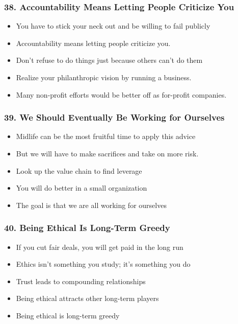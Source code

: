 \begin{frame}[fragile]
\frametitle{38. Accountability Means Letting People Criticize You}
\begin{itemize}
\item You have to stick your neck out and be willing to fail publicly
\item Accountability means letting people criticize you.
\item Don't refuse to do things just because others can't do them
\item Realize your philanthropic vision by running a business.
\item Many non-profit efforts would be better off  as for-profit companies.
\end{itemize}
\end{frame}

\begin{frame}[fragile]
\frametitle{39. We Should Eventually Be Working for Ourselves}
\begin{itemize}
\item Midlife can be the most fruitful time to apply this advice
\item But we will have to make sacrifices and take on more risk.
\item Look up the value chain to find leverage
\item You will do better in a small organization
\item The goal is that we are all working for ourselves
\end{itemize}
\end{frame}

\begin{frame}[fragile]
\frametitle{40. Being Ethical Is Long-Term Greedy}
\begin{itemize}
\item If you cut fair deals, you will get paid in the long run
\item Ethics isn't something you study; it's something you do
\item Trust leads to compounding relationships
\item Being ethical attracts other long-term players
\item Being ethical is long-term greedy
\end{itemize}
\end{frame}

